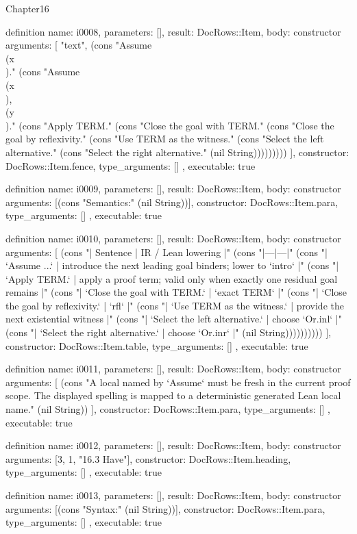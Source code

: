 \begin{lexlean}{Chapter16}
\begin{semanticmodule}
definition{
  name: i0008,
  parameters: [],
  result: DocRows::Item,
  body: constructor{
    arguments: [
      "text",
      (cons "Assume \\(x\\)." (cons "Assume \\(x\\), \\(y\\)." (cons "Apply TERM." (cons "Close the goal with TERM." (cons "Close the goal by reflexivity." (cons "Use TERM as the witness." (cons "Select the left alternative." (cons "Select the right alternative." (nil String)))))))))
    ],
    constructor: DocRows::Item.fence,
    type_arguments: []
  },
  executable: true
}

definition{
  name: i0009,
  parameters: [],
  result: DocRows::Item,
  body: constructor{
    arguments: [(cons "Semantics:" (nil String))],
    constructor: DocRows::Item.para,
    type_arguments: []
  },
  executable: true
}

definition{
  name: i0010,
  parameters: [],
  result: DocRows::Item,
  body: constructor{
    arguments: [
      (cons "| Sentence | IR / Lean lowering |" (cons "|---|---|" (cons "| `Assume ...` | introduce the next leading goal binders; lower to `intro` |" (cons "| `Apply TERM.` | apply a proof term; valid only when exactly one residual goal remains |" (cons "| `Close the goal with TERM.` | `exact TERM` |" (cons "| `Close the goal by reflexivity.` | `rfl` |" (cons "| `Use TERM as the witness.` | provide the next existential witness |" (cons "| `Select the left alternative.` | choose `Or.inl` |" (cons "| `Select the right alternative.` | choose `Or.inr` |" (nil String))))))))))
    ],
    constructor: DocRows::Item.table,
    type_arguments: []
  },
  executable: true
}

definition{
  name: i0011,
  parameters: [],
  result: DocRows::Item,
  body: constructor{
    arguments: [
      (cons "A local named by `Assume` must be fresh in the current proof scope. The displayed spelling is mapped to a deterministic generated Lean local name." (nil String))
    ],
    constructor: DocRows::Item.para,
    type_arguments: []
  },
  executable: true
}

definition{
  name: i0012,
  parameters: [],
  result: DocRows::Item,
  body: constructor{
    arguments: [3, 1, "16.3 Have"],
    constructor: DocRows::Item.heading,
    type_arguments: []
  },
  executable: true
}

definition{
  name: i0013,
  parameters: [],
  result: DocRows::Item,
  body: constructor{
    arguments: [(cons "Syntax:" (nil String))],
    constructor: DocRows::Item.para,
    type_arguments: []
  },
  executable: true
}


\end{semanticmodule}
\end{lexlean}
